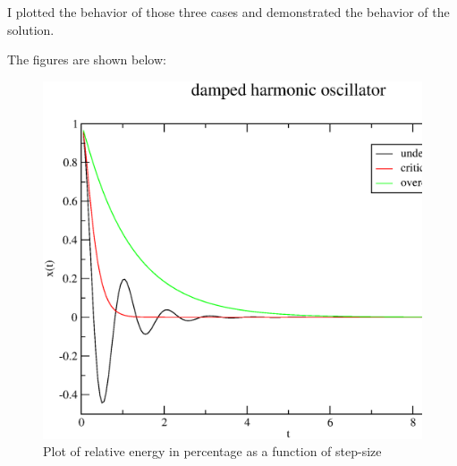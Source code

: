 \documentclass[11pt,a4paper,english]{article}
\begin{document}
    I plotted the behavior of those three cases and demonstrated the behavior of
    the solution.
    
        		    The figures are shown below:\\
	\begin{figure}[h!]
	\centering
	\includegraphics [scale=0.6]{figures/damped.eps}
	\caption{Plot of relative energy in percentage as a function of step-size }
	\end{figure}
	\clearpage
	
\end{document}
